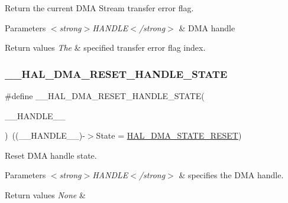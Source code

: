 Return the current D\+MA Stream transfer error flag. 


\begin{DoxyParams}{Parameters}
{\em $<$strong$>$\+H\+A\+N\+D\+L\+E$<$/strong$>$} & D\+MA handle \\
\hline
\end{DoxyParams}

\begin{DoxyRetVals}{Return values}
{\em The} & specified transfer error flag index. \\
\hline
\end{DoxyRetVals}
\mbox{\label{group___d_m_a_gaadcee34f0999c8eafd37de2f69daa0ac}} 
\subsubsection{\texorpdfstring{\_\_HAL\_DMA\_RESET\_HANDLE\_STATE}{\_\_HAL\_DMA\_RESET\_HANDLE\_STATE}}
{\footnotesize\ttfamily \#define \+\_\+\+\_\+\+H\+A\+L\+\_\+\+D\+M\+A\+\_\+\+R\+E\+S\+E\+T\+\_\+\+H\+A\+N\+D\+L\+E\+\_\+\+S\+T\+A\+TE(\begin{DoxyParamCaption}\item[{}]{\+\_\+\+\_\+\+H\+A\+N\+D\+L\+E\+\_\+\+\_\+ }\end{DoxyParamCaption})~((\+\_\+\+\_\+\+H\+A\+N\+D\+L\+E\+\_\+\+\_\+)-\/$>$State = \mbox{\hyperlink{group___d_m_a___exported___types_gga9c012af359987a240826f29073bbe463a9e7be73da32b8c837cde0318e0d5eed2}{H\+A\+L\+\_\+\+D\+M\+A\+\_\+\+S\+T\+A\+T\+E\+\_\+\+R\+E\+S\+ET}})}



Reset D\+MA handle state. 


\begin{DoxyParams}{Parameters}
{\em $<$strong$>$\+H\+A\+N\+D\+L\+E$<$/strong$>$} & specifies the D\+MA handle. \\
\hline
\end{DoxyParams}

\begin{DoxyRetVals}{Return values}
{\em None} & \\
\hline
\end{DoxyRetVals}
\mbox{\label{group___d_m_a_ga448a8f809df86ccffae200ffd33d0a82}} 
